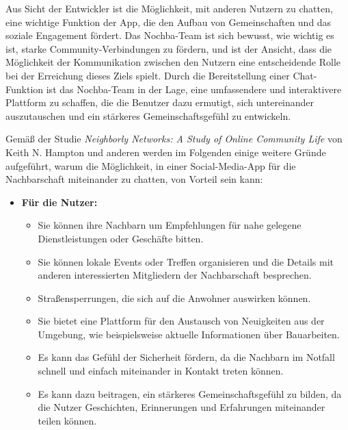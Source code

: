 Aus Sicht der Entwickler ist die Möglichkeit, mit anderen Nutzern zu chatten, eine wichtige Funktion der App, die den Aufbau von Gemeinschaften und das soziale Engagement fördert. Das Nochba-Team ist sich bewusst, wie wichtig es ist, starke Community-Verbindungen zu fördern, und ist der Ansicht, dass die Möglichkeit der Kommunikation zwischen den Nutzern eine entscheidende Rolle bei der Erreichung dieses Ziels spielt. Durch die Bereitstellung einer Chat-Funktion ist das Nochba-Team in der Lage, eine umfassendere und interaktivere Plattform zu schaffen, die die Benutzer dazu ermutigt, sich untereinander auszutauschen und ein stärkeres Gemeinschaftsgefühl zu entwickeln.

Gemäß der Studie \textit{Neighborly Networks: A Study of Online Community Life} von Keith N. Hampton und anderen werden im Folgenden einige weitere Gründe aufgeführt, warum die Möglichkeit, in einer Social-Media-App für die Nachbarschaft miteinander zu chatten, von Vorteil sein kann:

\begin{itemize}
  \item \textbf{Für die Nutzer:}
        \begin{itemize}
          \item {Sie können ihre Nachbarn um Empfehlungen für nahe gelegene Dienstleistungen oder Geschäfte bitten.}
          \item {Sie können lokale Events oder Treffen organisieren und die Details mit anderen interessierten Mitgliedern der Nachbarschaft besprechen.}
          \item {Straßensperrungen, die sich auf die Anwohner auswirken können.}
          \item {Sie bietet eine Plattform für den Austausch von Neuigkeiten aus der Umgebung, wie beispielsweise aktuelle Informationen über Bauarbeiten.}
          \item {Es kann das Gefühl der Sicherheit fördern, da die Nachbarn im Notfall schnell und einfach miteinander in Kontakt treten können.}
          \item {Es kann dazu beitragen, ein stärkeres Gemeinschaftsgefühl zu bilden, da die Nutzer Geschichten, Erinnerungen und Erfahrungen miteinander teilen können.}
        \end{itemize}
\end{itemize}

